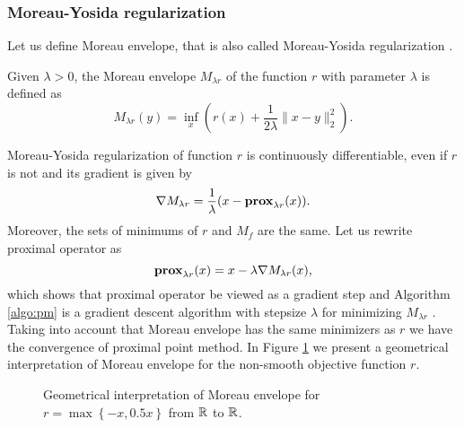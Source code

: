 \subsubsection{Moreau-Yosida regularization}\label{sec:basics_moreau-yosida}
Let us define  Moreau envelope, that is also called Moreau-Yosida regularization \cite{moreau1962fonctions, yosida2012functional}.

\begin{definition}
Given $\lambda>0$, the Moreau envelope $M_{\lambda r}$ of the function $r$ with parameter $\lambda$ is defined as 
\begin{equation}\label{eq:M-Y}
M_{\lambda r}(y) = \inf_x\left(r(x) + \frac{1}{2\lambda}\|x-y\|_2^2\right).
\end{equation}
\end{definition}

Moreau-Yosida regularization of function $r$ is continuously differentiable, even if $r$ is not \cite[Fact $17.17$]{yamada2011minimizing} and its gradient is given by
\begin{equation}\label{eq:M-Y_grad}
\nabla M_{\lambda r} = \frac{1}{\lambda}(x-\mathbf{prox}_{\lambda r}(x)).
\end{equation}
Moreover, the sets of minimums of $r$ and $M_f$ are the same. Let us rewrite  proximal operator as
$$
\mathbf{prox}_{\lambda r}(x) = x - \lambda\nabla M_{\lambda r}(x),
$$
which shows that proximal operator  be viewed as a gradient step and Algorithm \ref{algo:pm} is a gradient descent algorithm with stepsize $\lambda$ for minimizing $M_{\lambda r}$ \cite{rockafellar1976monotone}. Taking into account that  Moreau envelope has the same minimizers as $r$ we have the convergence of proximal point method. In Figure \ref{fig:M-Y} we present a geometrical interpretation of Moreau envelope for the non-smooth objective function $r$.

\begin{figure}[h]
    \centering
    
    \caption{Geometrical interpretation of Moreau envelope for $r = \max\left\{-x, 0.5x\right\}$ from $\mathbb{R}$ to $\mathbb{R}$.}
    \label{fig:M-Y}
\end{figure}

